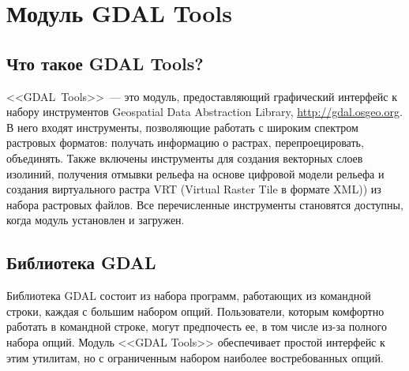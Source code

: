 
\section{Модуль GDAL Tools}\label{label_plugingdaltools}


\subsection{Что такое GDAL Tools?}\label{whatsgdal}
<<GDAL~Tools>>~--- это модуль, предоставляющий графический интерфейс к набору
инструментов Geospatial Data Abstraction Library, \url{http://gdal.osgeo.org}.
В него входят инструменты, позволяющие работать с широким спектром растровых
форматов: получать информацию о растрах, перепроецировать, объединять.
Также включены инструменты для создания векторных слоев изолиний,
получения отмывки рельефа на основе цифровой модели рельефа и создания виртуального растра VRT (Virtual Raster
Tile в формате XML)) из набора растровых файлов. Все перечисленные инструменты
становятся доступны, когда модуль установлен и загружен.

\subsection{Библиотека GDAL}\label{gdal_lib}
Библиотека GDAL состоит из набора программ, работающих из командной строки,
каждая с большим набором опций. Пользователи, которым комфортно работать в
командной строке, могут предпочесть ее, в том числе из-за полного набора
опций. Модуль <<GDAL Tools>> обеспечивает простой интерфейс к этим утилитам,
но с ограниченным набором наиболее востребованных опций.

